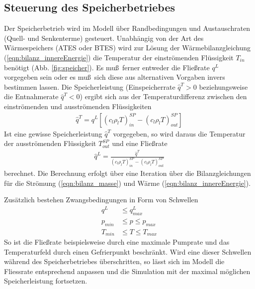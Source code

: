 \documentclass[12pt, a4paper, twoside, titlepage]{article}
\begin{document}
\subsection{Steuerung des Speicherbetriebes}
%
Der Speicherbetrieb wird im Modell \" uber Randbedingungen und Austauschraten (Quell- und Senkenterme) gesteuert.
%
Unabh\" angig von der Art des W\" armespeichers (ATES oder BTES) wird zur L\" osung der W\" armebilanzgleichung (\ref{eqn:bilanz_innereEnergie}) die Temperatur der einstr\" omenden Fl\" ussigkeit $T_{in}$ ben\" otigt (Abb. \ref{fig:speicher}).
%
Es mu\ss \ ferner entweder die Flie\ss rate $q^L$ vorgegeben sein oder es mu\ss \ sich diese aus alternativen Vorgaben invers bestimmen lassen.
%
%
Die Speicherleistung (Einspeicherrate $\hat q^T >0$ beziehungsweise die Entnahmerate $\hat q^T < 0$) ergibt sich aus der Temperaturdifferenz zwischen den einstr\" omenden und ausstr\" omenden Fl\" ussigkeiten
%
\begin{eqnarray}
\hat q^{T} = q^L \left[ (c_{l} \rho_{l} T)^{SP}_{in} - (c_{l} \rho_{l} T)^{SP}_{out}\right]
\label{eqn:leistung}
\end{eqnarray}
%
Ist eine gewisse Speicherleistung $\hat q^{T}$ vorgegeben, so wird daraus die Temperatur der ausstr\" omenden Fl\" ussigkeit $T^{SP}_{out}$ und eine Flie\ss rate 
%
\begin{eqnarray}
\hat q^L = \frac{\hat q^{T}}{ (c_{l} \rho_{l} T)^{SP}_{in} - (c_{l} \rho_{l} T)^{SP}_{out}}
\end{eqnarray}
%
berechnet.
%
Die Berechnung erfolgt \" uber eine Iteration \" uber die Bilanzgleichungen f\" ur die Str\" omung (\ref{eqn:bilanz_masse}) und W\" arme (\ref{eqn:bilanz_innereEnergie}). 


Zus\" atzlich bestehen Zwangsbedingungen in Form von Schwellen
%
\begin{subequations}
\begin{align}
q^L &\leq q_{max}^L
\label{eqn:schwelleFliessrate} \\
 p_{min} &\leq p \leq p_{max}
\label{eqn:schwelleDruckfeld} \\
 T_{min} &\leq T \leq T_{max}
\label{eqn:schwelleTemperaturfeld}
\end{align}
\end{subequations}
%
So ist die Flie\ss rate beispielsweise durch eine maximale Pumprate und das Temperaturfeld durch einen Gefrierpunkt beschr\" ankt.
%
Wird eine dieser Schwellen w\" ahrend des Speicherbetriebes \" uberschritten, so l\" asst sich im Modell die Fliessrate entsprechend anpassen und die Simulation mit der maximal m\" oglichen Speicherleistung fortsetzen.
\end{document}
